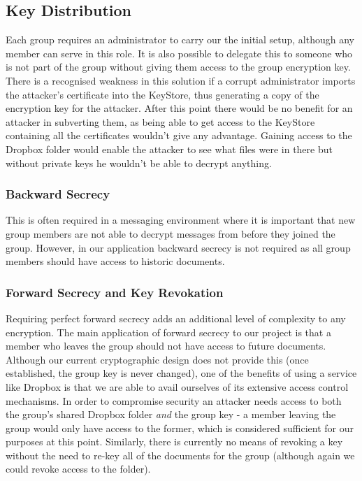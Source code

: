 \subsection*{Key Distribution}

Each group requires an administrator to carry our the initial setup, although any member can serve in this role.  It is also possible to delegate this to someone who is not part of the group without giving them access to the group encryption key.   There is a recognised weakness in this solution if a corrupt administrator imports the attacker's certificate into the KeyStore, thus generating a copy of the encryption key for the attacker. After this point there would be no benefit for an attacker in subverting them, as being able to get access to the KeyStore containing all the certificates wouldn't give any advantage.  Gaining access to the Dropbox folder would enable the attacker to see what files were in there but without private keys he wouldn't be able to decrypt anything.


\subsubsection*{Backward Secrecy}
This is often required in a messaging environment where it is important that new group members are not able to decrypt messages from before they joined the group. However, in our application backward secrecy is not required as all group members should have access to historic documents.


\subsubsection*{Forward Secrecy and Key Revokation}
Requiring perfect forward secrecy adds an additional level of complexity to any encryption.   The main application of forward secrecy to our project is that a member who leaves the group should not have access to future documents.  Although our current cryptographic design does not provide this (once established, the group key is never changed), one of the benefits of using a service like Dropbox is that we are able to avail ourselves of its extensive access control mechanisms.  In order to compromise security an attacker needs access to both the group's shared Dropbox folder \textit{and } the group key - a member leaving the group would only have access to the former, which is considered sufficient for our purposes at this point.  Similarly, there is currently no means of revoking a key without the need to re-key all of the documents for the group (although again we could revoke access to the folder).   

